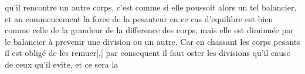 qu'il rencontre un autre corps, c'est comme si elle poussoit alors un tel balancier, et au commencement la force de la pesanteur en ce cas d'equilibre est bien comme celle de la grandeur de la difference des corps; mais elle est diminu\'{e}e par le balancier \`{a}
prevenir une division ou
un autre. Car en chassant les corps pesants il est oblig\'{e} de les remuer[,] par consequent il faut oster les divisions qu'il cause de ceux qu'il evite, et ce sera la
\count{}%
